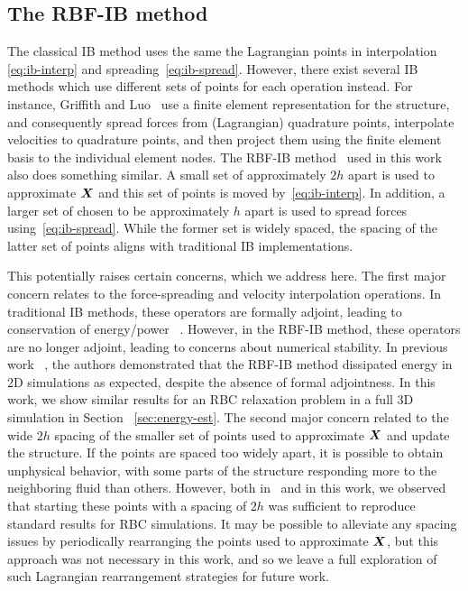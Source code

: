 \subsection{The RBF-IB method}\label{sec:rbfib}

The classical IB method uses the same the Lagrangian points in interpolation~%
\eqref{eq:ib-interp} and spreading~\eqref{eq:ib-spread}. However, there exist several IB
methods which use different sets of points for each operation instead. For instance,
Griffith and Luo~\cite{Griffith:2017id} use a finite element representation for the
structure, and consequently spread forces from (Lagrangian) quadrature points,
interpolate velocities to quadrature points, and then project them using the finite
element basis to the individual element nodes. The RBF-IB method~\cite{Shankar:2015km}
used in this work also does something similar. A small set of  approximately $2h$ apart is used to approximate $\boldsymbol{X}$ and this set of
points is moved by~\eqref{eq:ib-interp}. In addition, a larger set of
 chosen to be approximately $h$ apart is used to spread
forces using~\eqref{eq:ib-spread}. While the former set is widely spaced, the spacing of
the latter set of points aligns with traditional IB implementations.

This potentially raises certain concerns, which we address here. The first major concern
relates to the force-spreading and velocity interpolation operations. In traditional IB
methods, these operators are formally adjoint, leading to conservation of energy/power~%
\cite{Peskin:2002go}. However, in the RBF-IB method, these operators are no longer
adjoint, leading to concerns about numerical stability. In previous work~%
\cite{Shankar:2015km}, the authors demonstrated that the RBF-IB method dissipated energy
in 2D simulations as expected, despite the absence of formal adjointness. In this work,
we show similar results for an RBC relaxation problem in a full 3D simulation in Section%
~\ref{sec:energy-est}. The second major concern related to the wide $2h$ spacing of the
smaller set of points used to approximate $\boldsymbol{X}$ and update the structure. If the points
are spaced too widely apart, it is possible to obtain unphysical behavior, with some
parts of the structure responding more to the neighboring fluid than others.  However,
both in~\cite{Shankar:2015km} and in this work, we observed that starting these points
with a spacing of $2h$ was sufficient to reproduce standard results for RBC simulations.
It may be possible to alleviate any spacing issues by periodically rearranging the points
used to approximate $\boldsymbol{X}$, but this approach was not necessary in this work, and so we
leave a full exploration of such Lagrangian rearrangement strategies for future work.
